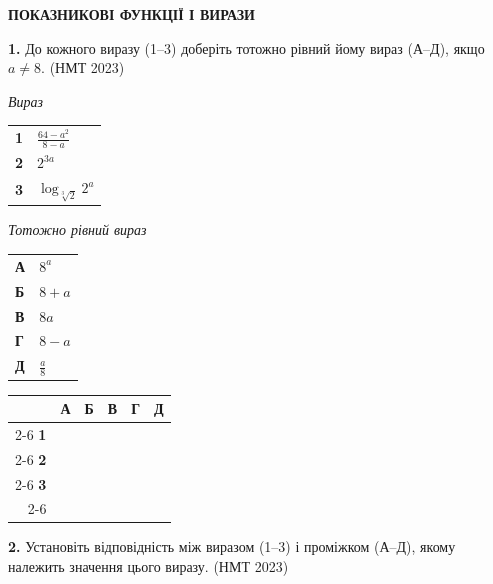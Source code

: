 \documentclass[14pt]{extarticle}
\newcommand{\answerGrid}{
    \begingroup
    \setlength{\tabcolsep}{4pt}
    \renewcommand{\arraystretch}{1.2}
    \small
    \begin{tabular}{r|c|c|c|c|c|}
         \multicolumn{1}{c}{} & \multicolumn{1}{c}{\textbf{А}} & \multicolumn{1}{c}{\textbf{Б}} & \multicolumn{1}{c}{\textbf{В}} & \multicolumn{1}{c}{\textbf{Г}} & \multicolumn{1}{c}{\textbf{Д}} \\ \cline{2-6}
         \textbf{1} & & & & & \\ \cline{2-6}
         \textbf{2} & & & & & \\ \cline{2-6}
         \textbf{3} & & & & & \\ \cline{2-6}
    \end{tabular}
    \endgroup
}
\newcommand{\nmtyear}[1]{\hfill{\small\color{yearcolor}(НМТ #1)}}
\begin{document}
\begin{center}
{\Large\textbf{\color{headerblue}ПОКАЗНИКОВІ ФУНКЦІЇ І ВИРАЗИ}}
\end{center}

\vspace{0.5cm}

\noindent\textbf{1.} До кожного виразу (1–3) доберіть тотожно рівний йому вираз (А–Д), якщо $a \neq 8$. \nmtyear{2023}
\vspace{0.3cm}

\noindent
\begin{minipage}[t]{0.45\textwidth}
    \textit{Вираз} \par \vspace{0.2cm}
    \begin{tabular}{@{}p{0.5cm} l@{}}
    \textbf{1} & $\displaystyle\frac{64 - a^2}{8 - a}$ \\[0.5cm]
    \textbf{2} & \colorbox{yellow!30}{$2^{3a}$} \\[0.4cm]
    \textbf{3} & $\log_{\sqrt[3]{2}} 2^a$ \\
    \end{tabular}
\end{minipage}%
\hfill
\begin{minipage}[t]{0.50\textwidth}
    \textit{Тотожно рівний вираз} \par \vspace{0.2cm}
    \begin{tabular}{@{}p{0.5cm} p{7cm}@{}}
    \textbf{А} & $8^a$ \\[0.2cm]
    \textbf{Б} & $8 + a$ \\[0.2cm]
    \textbf{В} & $8a$ \\[0.2cm]
    \textbf{Г} & $8 - a$ \\[0.2cm]
    \textbf{Д} & $\displaystyle\frac{a}{8}$ \\
    \end{tabular}
\end{minipage}
\vspace{0.3cm}

\answerGrid
\vspace{0.7cm}

\noindent\textbf{2.} Установіть відповідність між виразом (1–3) і проміжком (А–Д), якому належить значення цього виразу. \nmtyear{2023}
\vspace{0.3cm}
\end{document}
